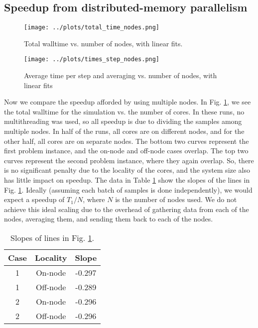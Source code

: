 \documentclass{article}
\begin{document}
\subsection{Speedup from distributed-memory parallelism}

\begin{figure}
    \centering
    \texttt{[image: ../plots/total\_time\_nodes.png]}
    \caption{Total walltime vs. number of nodes, with linear fits.}
    \label{fig:node-total-walltime}
\end{figure}

\begin{figure}
    \centering
    \texttt{[image: ../plots/times\_step\_nodes.png]}
    \caption{Average time per step and averaging vs. number of nodes, with 
    linear fits}
    \label{fig:node-average-step}
\end{figure}

Now we compare the speedup afforded by using multiple nodes. In Fig. \ref{fig:node-total-walltime}, we see the 
total walltime for the simulation vs. the number of cores. In these runs, no multithreading was used, so 
all speedup is due to dividing the samples among multiple nodes. In half of the runs, all cores are on different nodes,
and for the other half, all cores are on separate nodes. The bottom two curves represent the first problem instance,
and the on-node and off-node cases overlap. The top two curves represent the second problem instance, where they 
again overlap.  So, there is no significant penalty due to the locality of the cores, and the system size also 
has little impact on speedup.  The data in Table \ref{tab:node-slopes} show the slopes of the lines in 
Fig. \ref{fig:node-total-walltime}. Ideally (assuming each batch of samples is done independently), 
we would expect a speedup of \(T_1/N\), where \(N\) is the number of nodes used. We do not achieve this ideal 
scaling due to the overhead of gathering data from each of the nodes, averaging them, and sending them back to each 
of the nodes. 

\begin{table}
    \centering
    \begin{tabular}{|c|c|c|}
        \hline
        Case & Locality & Slope \\
        \hline 
        1 & On-node & -0.297 \\
        1 & Off-node & -0.289 \\
        2 & On-node & -0.296 \\
        2 & Off-node & -0.296 \\
        \hline 
    \end{tabular}
    \caption{Slopes of lines in Fig. \ref{fig:node-total-walltime}.}
    \label{tab:node-slopes}
\end{table}
\end{document}
